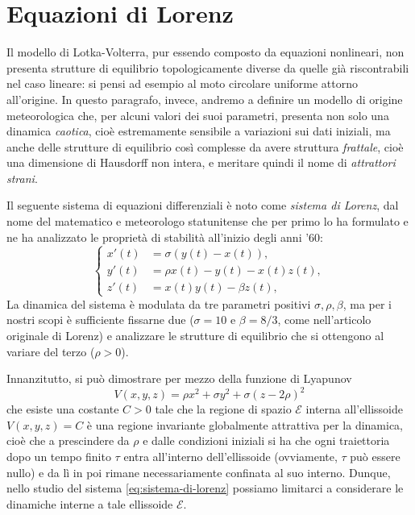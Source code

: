 \section{Equazioni di Lorenz}

Il modello di Lotka-Volterra, pur essendo composto da equazioni nonlineari,
non presenta strutture di equilibrio topologicamente diverse da quelle
già riscontrabili nel caso lineare: si pensi ad esempio al moto
circolare uniforme attorno all'origine.
In questo paragrafo, invece, andremo a definire un modello di origine meteorologica
che, per alcuni valori dei suoi parametri, presenta non solo una dinamica \emph{caotica},
cioè estremamente sensibile a variazioni sui dati iniziali, ma anche
delle strutture di equilibrio così complesse da avere struttura \emph{frattale},
cioè una dimensione di Hausdorff non intera, e meritare quindi il nome di
\emph{attrattori strani}.

Il seguente sistema di equazioni differenziali è noto come \emph{sistema di Lorenz},
dal nome del matematico e meteorologo statunitense che per primo lo ha formulato
e ne ha analizzato le proprietà di stabilità all'inizio degli anni '60:
\begin{equation} \label{eq:sistema-di-lorenz}
\left\{
\begin{aligned}
x'(t) &= \sigma (y(t)-x(t)), \\
y'(t) &= \rho x(t) - y(t) - x(t)z(t), \\
z'(t) &= x(t)y(t) - \beta z(t),
\end{aligned}
\right.
\end{equation}
La dinamica del sistema è modulata da tre parametri positivi $\sigma,\rho,\beta$,
ma per i nostri scopi è sufficiente fissarne due ($\sigma = 10$ e $\beta = 8/3$,
come nell'articolo originale di Lorenz) e analizzare le strutture di equilibrio
che si ottengono al variare del terzo ($\rho > 0$).

Innanzitutto, si può dimostrare per mezzo della funzione di Lyapunov
\[
V(x,y,z) = \rho x^2 + \sigma y^2 + \sigma (z-2\rho)^2
\]
che esiste una costante $C > 0$ tale che la regione di spazio $\mathcal{E}$ interna
all'ellissoide $V(x,y,z) = C$ è una regione invariante globalmente attrattiva
per la dinamica, cioè che a prescindere da $\rho$ e dalle condizioni iniziali
si ha che ogni traiettoria dopo un tempo finito $\tau$ entra all'interno
dell'ellissoide (ovviamente, $\tau$ può essere nullo) e da lì in poi rimane
necessariamente confinata al suo interno. Dunque, nello studio del sistema
\eqref{eq:sistema-di-lorenz} possiamo limitarci a considerare le dinamiche
interne a tale ellissoide $\mathcal{E}$.

